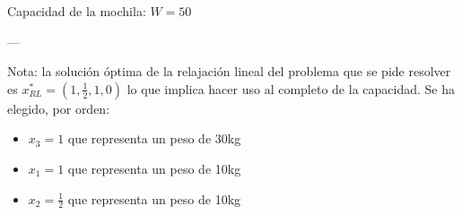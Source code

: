Capacidad de la mochila: $W=50$

---

Nota: la solución óptima de la relajación lineal del problema que se pide resolver es $x^*_{RL}=(1,\frac{1}{2},1,0)$ lo que implica hacer uso al completo de la capacidad. Se ha elegido, por orden:
\begin{itemize}
    \item $x_3=1$ que representa un peso de 30kg
    \item $x_1=1$ que representa un peso de 10kg
    \item $x_2=\frac{1}{2}$ que representa un peso de 10kg 
\end{itemize}